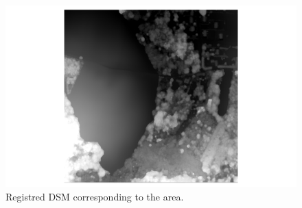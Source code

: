\documentclass[a4paper, 11pt]{article}
\begin{document}
	\begin{figure}[H]
		\begin{center}
			\caption{\label{img::dsm} Registred DSM corresponding to the area.}
			\includegraphics[scale=.4]{images/raster/elancourt/dsm.png}
		\end{center}
	\end{figure}
	
\end{document}
